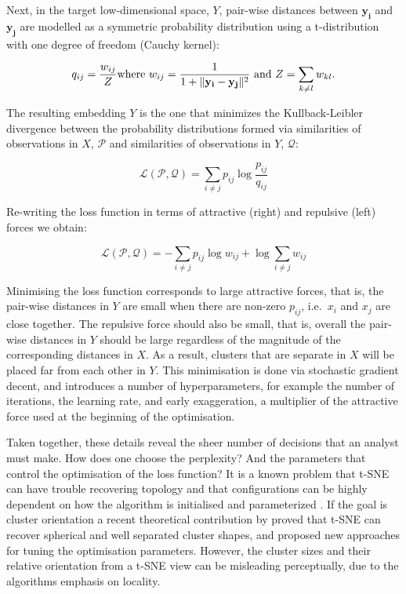 \documentclass[article,notitle]{jdssv}
\begin{document}
Next, in the target low-dimensional space, \(Y\), pair-wise distances between
\(\mathbf{y_i}\) and \(\mathbf{y_j}\) are modelled as a symmetric probability
distribution using a t-distribution with one degree of freedom (Cauchy kernel):

\[ q_{ij} = \frac{w_{ij}}{Z} \\ \text{where } w_{ij} = \frac{1}{ 1 + \lVert
\mathbf{y_i - y_j} \rVert ^ 2} \text{ and } Z = \sum_{k \ne l} w_{kl}. \]

The resulting embedding \(Y\) is the one that minimizes the Kullback-Leibler
divergence between the probability distributions formed via similarities of
observations in \(X\), \(\mathcal{P}\) and similarities of observations in \(Y\),
\(\mathcal{Q}\):

\[ \mathcal{L(\mathcal{P}, \mathcal{Q})} = \sum_{i \ne j} p_{ij} \log
\frac{p_{ij}}{q_{ij}}\]

Re-writing the loss function in terms of attractive (right) and repulsive
(left) forces we obtain:

\[ \mathcal{L(\mathcal{P}, \mathcal{Q})} = -\sum_{i \ne j} p_{ij}\log w_{ij} +
\log\sum_{i \ne j} w_{ij} \]

Minimising the loss function corresponds to large attractive
forces, that is, the pair-wise distances in \(Y\) are small when there are
non-zero \(p_{ij}\), i.e.~\(x_i\) and \(x_j\) are close together. The repulsive force
should also be small, that is, overall the
pair-wise distances in \(Y\) should be large regardless of the magnitude of the
corresponding distances in \(X\). As a result, clusters that are separate in \(X\)
will be placed far from each other in \(Y\).
This minimisation is done via stochastic gradient decent,
and introduces a number of hyperparameters, for example the number of iterations,
the learning rate, and early exaggeration, a multiplier of the attractive force
used at the beginning of the optimisation.

Taken together, these details reveal the sheer number of decisions that an
analyst must make. How does one choose the perplexity? And the
parameters that control the optimisation of the loss function?
It is a known problem that
t-SNE can have trouble recovering topology and that configurations can be
highly dependent on how the algorithm is initialised and parameterized
\citep{Wattenberg2016-ji, Kobak2019-lm, Melville2020}. If the goal is cluster
orientation a recent theoretical contribution by \citet{Linderman2019-dq} proved that
t-SNE can recover spherical and well separated cluster shapes, and proposed new
approaches for tuning the optimisation parameters. However, the cluster sizes
and their relative orientation from a t-SNE view can be misleading
perceptually, due to the algorithms emphasis on locality.
\end{document}
